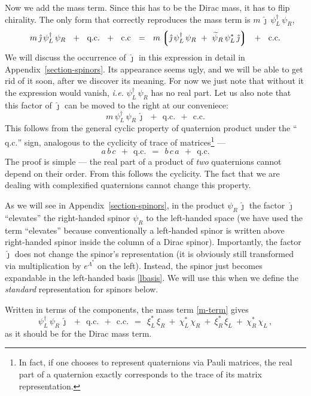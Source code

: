 \documentclass[epsfig,12pt]{article}
\newcommand{\wt}{\widetilde}
\newcommand{\lgr}{\left\lgroup}
\newcommand{\rgr}{\right\rgroup}
\newcommand{\jj}{\hat\jmath}
\begin{document}
	Now we add the mass term.
	Since this has to be the Dirac mass, it has to flip chirality.
	The only form that correctly reproduces the mass term is $ m\, \jj\, \psi_L^\dag\, \psi_R $,
\begin{equation}
	m\, \jj\, \psi_L^\dag\, \psi_R  ~~+~~  \text{q.c.}  ~~+~~  \text{c.c}  ~~=~~
	m \lgr \jj\, \psi_L^\dag\, \psi_R  ~+~  \wt\psi{}_R\, \psi_L^*\, \jj \rgr
	~~+~~  \text{c.c.}
\end{equation}
	We will discuss the occurrence of $ \jj $ in this expression in detail in Appendix~\ref{section-spinors}.
	Its appearance seems ugly, and we will be able to get rid of it soon, after we discover its meaning.
	For now we just note that without it the expression would vanish, \emph{i.e.} $ \psi_L^\dag\, \psi_R $
	has no real part.
	Let us also note that this factor of $ \jj $ can be moved to the right at our conveniece:
\begin{equation}
\label{m-term}
	m\, \psi_L^\dag\, \psi_R\, \jj  ~~+~~  \text{q.c.}  ~~+~~  \text{c.c.}
\end{equation}
	This follows from the general cyclic property of quaternion product
	under the ``$ \text{q.c.} $'' sign, analogous to the cyclicity of trace of matrices\footnote{
		In fact, if one chooses to represent quaternions via Pauli matrices, the real
		part of a quaternion exactly corresponds to the trace of its matrix representation.
	} ---
\begin{equation}
	a\, b\, c  ~~+~~  \text{q.c.}	~~=~~	b\, c\, a  ~~+~~  \text{q.c.}
\end{equation}
	The proof is simple --- the real part of a product of \emph{two} quaternions cannot depend
	on their order.
	From this follows the cyclicity.
	The fact that we are dealing with complexified quaternions cannot change this property.

	As we will see in Appendix~\ref{section-spinors}, in the product $ \psi_R\, \jj $ the factor $ \jj $
	``elevates'' the right-handed spinor $ \psi_R $ to the left-handed space
	(we have used the term ``elevates'' because conventionally a left-handed spinor is
	written above right-handed spinor inside the column of a Dirac spinor).
	Importantly, the factor $ \jj $ does not change the spinor's representation (it is obviously still transformed
	via multiplication by $ e^{\Lambda^*} $ on the left).
	Instead, the spinor just becomes expandable in the left-handed basis \eqref{lbasis}.
	We will use this when we define the \emph{standard} representation for spinors below.

	Written in terms of the components, the mass term \eqref{m-term} gives
\begin{equation}
	\psi_L^\dag\, \psi_R\, \jj  ~~+~~  \text{q.c.}  ~~+~~  \text{c.c.}	~~=~~
	\xi_L^*\,\xi_R  ~+~ \chi_L^*\,\chi_R  ~+~  \xi_R^*\,\xi_L  ~+~ \chi_R^*\,\chi_L\,,
\end{equation}
	as it should be for the Dirac mass term.
\end{document}

